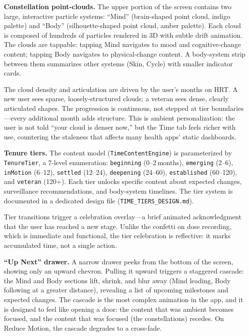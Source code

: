 \documentclass[11pt,a4paper]{article}
\newcommand{\code}[1]{\texttt{\small #1}}
\begin{document}
\textbf{Constellation point-clouds.} The upper portion of the screen
contains two large, interactive particle systems: ``Mind''
(brain-shaped point cloud, indigo palette) and ``Body''
(silhouette-shaped point cloud, amber palette). Each cloud is composed of
hundreds of particles rendered in 3D with subtle drift animation. The
clouds are tappable: tapping Mind navigates to mood and cognitive-change
content; tapping Body navigates to physical-change content. A body-system
strip between them summarizes other systems (Skin, Cycle) with smaller
indicator cards.

The cloud density and articulation are driven by the user's months on HRT.
A new user sees sparse, loosely-structured clouds; a veteran sees dense,
clearly articulated shapes. The progression is continuous, not stepped at
tier boundaries---every additional month adds structure. This is ambient
personalization: the user is not told ``your cloud is denser now,'' but
the Time tab feels richer with use, countering the staleness that affects
many health apps' static dashboards.

\textbf{Tenure tiers.} The content model (\code{TimeContentEngine}) is
parameterized by \code{TenureTier}, a 7-level enumeration:
\code{beginning} (0--2\,months), \code{emerging} (2--6), \code{inMotion}
(6--12), \code{settled} (12--24), \code{deepening} (24--60),
\code{established} (60--120), and \code{veteran} (120+). Each tier
unlocks specific content about expected changes, surveillance
recommendations, and body-system timelines. The tier system is documented
in a dedicated design file (\code{TIME\_TIERS\_DESIGN.md}).

Tier transitions trigger a celebration overlay---a brief animated
acknowledgment that the user has reached a new stage. Unlike the confetti
on dose recording, which is immediate and functional, the tier
celebration is reflective: it marks accumulated time, not a single
action.

\textbf{``Up Next'' drawer.} A narrow drawer peeks from the bottom of the
screen, showing only an upward chevron. Pulling it upward triggers a
staggered cascade: the Mind and Body sections lift, shrink, and blur away
(Mind leading, Body following at a greater distance), revealing a list of
upcoming milestones and expected changes. The cascade is the most complex
animation in the app, and it is designed to feel like opening a door: the
content that was ambient becomes focused, and the content that was focused
(the constellations) recedes. On Reduce Motion, the cascade degrades to a
cross-fade.
\end{document}
